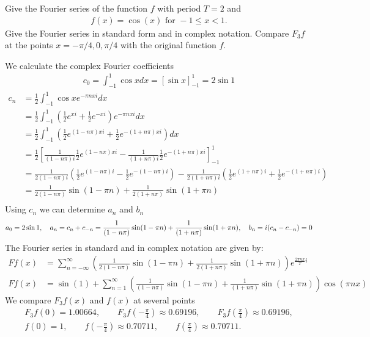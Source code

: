 \documentclass[11pt]{article}
\begin{document}
\begin{exercise}
    Give the Fourier series of the function $f$ with period $T = 2$ and 
    \begin{gather*}
        f(x) = \cos(x) \text{ for } -1 \leq x < 1.
    \end{gather*}
    Give the Fourier series in standard form and in complex notation. 
    Compare $F_3 f$ at the points $x = -\pi/4, 0, \pi/4$ with the original function $f$.
\end{exercise}
\begin{solution}    
We calculate the complex Fourier coefficients 
\begin{align*}
    c_0 = \int_{-1}^1 \cos x dx = [\sin x]_{-1}^1 = 2\sin 1
\end{align*}
\begin{align*}
    c_n &= \frac 1 2 \int_{-1}^1 \cos x e^{-\pi n x i} dx\\
    &= \frac 1 2 \int_{-1}^1 \left(\frac 1 2 e^{x i} + \frac 1 2 e^{-x i} \right) e^{-\pi n x i} dx\\
    &= \frac 1 2 \int_{-1}^1 \left(\frac 1 2 e^{(1-n\pi)x i} + \frac 1 2 e^{-(1+n\pi)x i} \right) dx\\
    &= \frac 1 2\left[\frac{1}{(1-n\pi) i}\frac 1 2 e^{(1-n\pi)x i} - \frac{1}{(1+n\pi) i}\frac 1 2 e^{-(1+n\pi)x i} \right]_{-1}^1\\
    &= \frac{1}{2(1-n\pi) i}\left( \frac 1 2 e^{(1-n\pi)i}- \frac 1 2 e^{-(1-n\pi) i}\right) - \frac{1}{2(1+n\pi) i}\left( \frac 1 2 e^{(1+n\pi)i}+ \frac 1 2 e^{-(1+n\pi) i}\right)\\
    &= \frac{1}{2(1-n\pi)}\sin(1-\pi n) + \frac{1}{2(1+n\pi)}\sin(1+\pi n)\\
\end{align*}
Using $c_n$ we can determine $a_n$ and $b_n$
$$
    a_0 = 2\sin 1,\quad a_n = c_n + c_{-n} = \frac{1}{(1-n\pi)}\sin(1-\pi n) + \frac{1}{(1+n\pi)}\sin(1+\pi n)\\, \quad b_n = i(c_n - c_{-n}) = 0
$$
The Fourier series in standard and in complex notation are given by:
\begin{align*}
    F f(x)&=\sum_{n=-\infty}^{\infty} \left(\frac{1}{2(1-n\pi)}\sin(1-\pi n) + \frac{1}{2(1+n\pi)}\sin(1+\pi n)\right) e^{\frac{2 \pi n x}{T} i}
    \\
    F f(x)&=\sin(1)+\sum_{n=1}^{\infty} \left(  \frac{1}{(1-n\pi) }\sin(1-\pi n) + \frac{1}{(1+n\pi)}\sin(1+\pi n) \right) \cos \left(\pi n x\right)
\end{align*}
We compare $F_3f(x)$ and $f(x)$ at several points 
\begin{gather*}
    F_3f(0) = 1.00664,\qquad 
    F_3f\left(-\frac{\pi}{4}\right) \approx 0.69196,\qquad 
    F_3f\left(\frac{\pi}{4}\right) \approx 0.69196,
    \\
    f(0) = 1,\qquad 
    f\left(-\frac{\pi}{4}\right) \approx 0.70711,\qquad
    f\left(\frac{\pi}{4}\right) \approx 0.70711.
\end{gather*}

\end{solution}
\end{document}
